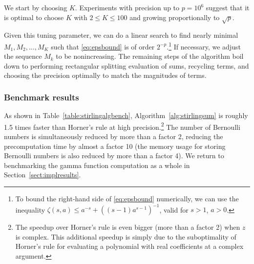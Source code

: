 \documentclass[reqno]{amsart}
\theoremstyle{definition}
\begin{document}
\begin{algorithm}
\end{algorithm}

We start by choosing $K$.
Experiments with precision up to $p = 10^6$
suggest that it is optimal to choose $K$ with
$2 \le K \le 100$ and growing proportionally
to $\sqrt{p}$.

Given this tuning parameter, we can do a linear search
to find nearly minimal $M_1, M_2, \ldots, M_K$ such that
\eqref{eq:epsbound} is of order $2^{-p}$.\footnote{To bound the right-hand side of \eqref{eq:epsbound} numerically, we can use the inequality
$\zeta(s,a) \le a^{-s} + ((s-1) a^{s-1})^{-1}$, valid
for $s > 1$, $a > 0$.}
If necessary,
we adjust the sequence $M_k$ to be nonincreasing.
The remaining steps of the algorithm boil down to
performing rectangular splitting evaluation of sums, recycling terms,
and choosing the precision optimally to match the magnitudes of terms.

\subsubsection{Benchmark results}

As shown in Table~\ref{table:stirlingalgbench},
Algorithm~\ref{alg:stirlingsum} is roughly 1.5 times faster
than Horner's rule at high precision.\footnote{The speedup over Horner's rule is even bigger (more than a factor 2) when $z$ is complex. This additional speedup is simply due to the suboptimality
of Horner's rule for evaluating a polynomial with real
coefficients at a complex argument.}
The number of Bernoulli numbers is simultaneously
reduced by more than a factor 2,
reducing the precomputation time by almost a factor 10 (the memory usage
for storing Bernoulli numbers is also reduced by more than a factor 4).
We return to benchmarking the gamma function
computation as a whole in Section~\ref{sect:implresults}.
\end{document}
